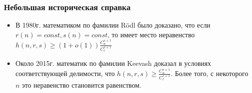 \subsubsection*{Небольшая историческая справка}

\begin{itemize}
	\item В 1980г. математиком по фамилии Rödl было доказано, что если $r(n) = const, s(n) = const$, то имеет место неравенство \(h(n, r, s) \ge (1 + o(1)) \frac{C_n^{s + 1}}{C_r^{s + 1}}\)
	
	\item Около 2015г. математик по фамилии Keevash доказал в условиях соответствующей делимости, что $h(n, r, s) \ge \frac{C_n^{s + 1}}{C_r^{s + 1}}$. Более того, с некоторого $n$ это неравенство становится равенством.
\end{itemize}